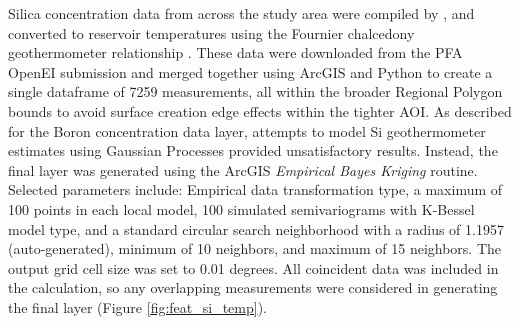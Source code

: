 Silica concentration data from across the study area were compiled by \citet{bielicki_hydrogeolgic_2015}, and converted to reservoir temperatures using the Fournier chalcedony geothermometer relationship \citep{fournier_chemical_1977}. These data were downloaded from the PFA OpenEI submission \citep{kelley_geothermal_2015} and merged together using ArcGIS and Python to create a single dataframe of 7259 measurements, all within the broader Regional Polygon bounds to avoid surface creation edge effects within the tighter AOI. As described for the Boron concentration data layer, attempts to model Si geothermometer estimates using Gaussian Processes provided unsatisfactory results. Instead, the final layer was generated using the ArcGIS \textit{Empirical Bayes Kriging} routine. Selected parameters include: Empirical data transformation type, a maximum of 100 points in each local model, 100 simulated semivariograms with K-Bessel model type, and a standard circular search neighborhood with a radius of 1.1957 (auto-generated), minimum of 10 neighbors, and maximum of 15 neighbors. The output grid cell size was set to 0.01 degrees. All coincident data was included in the calculation, so any overlapping measurements were considered in generating the final layer (Figure \ref{fig:feat_si_temp}).

